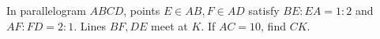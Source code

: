 In parallelogram $ ABCD $, points $ E\in AB,F\in AD $ satisfy $ BE:EA=1:2 $ and $ AF:FD=2:1 $. Lines $ BF,DE $ meet at $ K $. If $ AC=10 $, find $ CK $.
